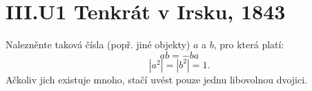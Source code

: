 \documentclass{../../../../style/mkimain}
\begin{document}
\section*{III.U1 Tenkrát v Irsku, 1843}
\noindent Nalezněnte taková čísla (popř. jiné objekty) $a$ a $b$, pro která platí:
$$ab=-ba$$
$$|a^2|=|b^2|=1\text{.}$$
Ačkoliv jich existuje mnoho, stačí uvést pouze jednu libovolnou dvojici.
\end{document}
